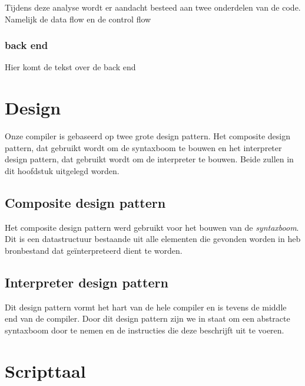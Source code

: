 \documentclass[10pt,a4paper]{article}
\begin{document}
Tijdens deze analyse wordt er aandacht besteed aan twee onderdelen van de code. Namelijk de data flow en de control flow

\subsubsection{back end}
Hier komt de tekst over de back end

\section{Design}
Onze compiler is gebaseerd op twee grote design pattern. Het composite design pattern, dat gebruikt wordt om de syntaxboom te bouwen en het interpreter design pattern, dat gebruikt wordt om de interpreter te bouwen. Beide zullen in dit hoofdstuk uitgelegd worden.

\subsection{Composite design pattern}
Het composite design pattern werd gebruikt voor het bouwen van de \emph{syntaxboom}. Dit is een datastructuur bestaande uit alle elementen die gevonden worden in heb bronbestand dat geïnterpreteerd dient te worden.

\subsection{Interpreter design pattern}
Dit design pattern vormt het hart van de hele compiler en is tevens de middle end van de compiler. Door dit design pattern zijn we in staat om een abstracte syntaxboom door te nemen en de instructies die deze beschrijft uit te voeren.

\section{Scripttaal}
\end{document}
